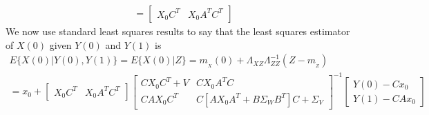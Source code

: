 \begin{enumerate}
\begin{align*}
    & = \begin{bmatrix}
            X_0 C^T & X_0 A^T C^T
        \end{bmatrix}
\end{align*}
We now use standard least squares results to say that the least squares estimator of $X(0)$ given $Y(0)$ and $Y(1)$ is
\begin{multline*}
    E\{X(0)| Y(0),Y(1) \} = E\{X(0)|Z\} = m_{_X}(0) + \Lambda_{XZ} \Lambda_{ZZ}^{-1} (Z - m_{_Z}) \\
    = x_0 + \begin{bmatrix}
            X_0 C^T & X_0 A^T C^T
        \end{bmatrix} \begin{bmatrix}
            C X_0 C^T + V & C X_0 A^T C \\
            C A X_0 C^T & C [AX_0 A^T + B \Sigma_W B^T] C + \Sigma_V
        \end{bmatrix}^{-1} \begin{bmatrix}
            Y(0) - Cx_0 \\
            Y(1) - CAx_0
        \end{bmatrix}
\end{multline*}

\end{enumerate}


